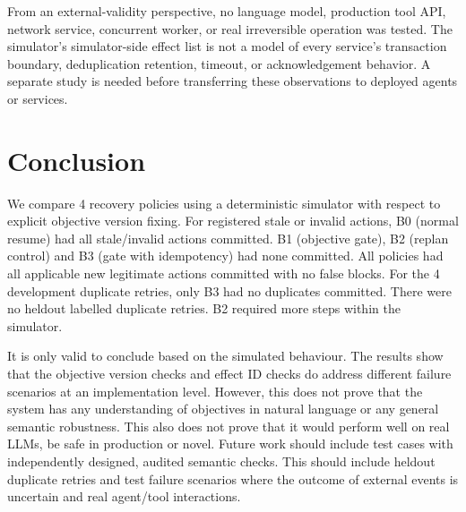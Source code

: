 \documentclass[conference]{IEEEtran}
\begin{document}
From an external-validity perspective, no language model, production tool API, network service, concurrent worker, or real irreversible operation was tested. The simulator's simulator-side effect list is not a model of every service's transaction boundary, deduplication retention, timeout, or acknowledgement behavior. A separate study is needed before transferring these observations to deployed agents or services.

\section{Conclusion}
We compare 4 recovery policies using a deterministic simulator with respect to explicit objective version fixing. For registered stale or invalid actions, B0 (normal resume) had all stale/invalid actions committed. B1 (objective gate), B2 (replan control) and B3 (gate with idempotency) had none committed. All policies had all applicable new legitimate actions committed with no false blocks. For the 4 development duplicate retries, only B3 had no duplicates committed. There were no heldout labelled duplicate retries. B2 required more steps within the simulator.

It is only valid to conclude based on the simulated behaviour. The results show that the objective version checks and effect ID checks do address different failure scenarios at an implementation level. However, this does not prove that the system has any understanding of objectives in natural language or any general semantic robustness. This also does not prove that it would perform well on real LLMs, be safe in production or novel. Future work should include test cases with independently designed, audited semantic checks. This should include heldout duplicate retries and test failure scenarios where the outcome of external events is uncertain and real agent/tool interactions.
\end{document}
